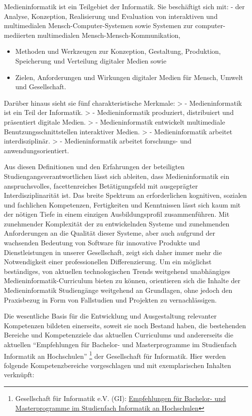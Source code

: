 \begin{siderules}
Medieninformatik ist ein Teilgebiet der Informatik. Sie beschäftigt sich
mit: - der Analyse, Konzeption, Realisierung und Evaluation von
interaktiven und multimedialen Mensch-Computer-Systemen sowie Systemen
zur computer-mediierten multimedialen Mensch-Mensch-Kommunikation,

\begin{itemize}
\tightlist
\item
  Methoden und Werkzeugen zur Konzeption, Gestaltung, Produktion,
  Speicherung und Verteilung digitaler Medien sowie
\item
  Zielen, Anforderungen und Wirkungen digitaler Medien für Mensch,
  Umwelt und Gesellschaft.
\end{itemize}
\end{siderules}

Darüber hinaus sieht sie fünf charakteristische Merkmale: \textgreater{}
- Medieninformatik ist ein Teil der Informatik. \textgreater{} -
Medieninformatik produziert, distribuiert und präsentiert digitale
Medien. \textgreater{} - Medieninformatik entwickelt multimediale
Benutzungsschnittstellen interaktiver Medien. \textgreater{} -
Medieninformatik arbeitet interdisziplinär. \textgreater{} -
Medieninformatik arbeitet forschungs- und anwendungsorientiert.

Aus diesen Definitionen und den Erfahrungen der beteiligten
Studiengangsverantwortlichen lässt sich ableiten, dass Medieninformatik
ein anspruchsvolles, facettenreiches Betätigungsfeld mit ausgeprägter
Interdisziplinarität ist. Das breite Spektrum an erforderlichen
kognitiven, sozialen und fachlichen Kompetenzen, Fertigkeiten und
Kenntnissen lässt sich kaum mit der nötigen Tiefe in einem einzigen
Ausbildungsprofil zusammenführen. Mit zunehmender Komplexität der zu
entwickelnden Systeme und zunehmenden Anforderungen an die Qualität
dieser Systeme, aber auch aufgrund der wachsenden Bedeutung von Software
für innovative Produkte und Dienstleistungen in unserer Gesellschaft,
zeigt sich daher immer mehr die Notwendigkeit einer professionellen
Differenzierung. Um ein möglichst beständiges, von aktuellen
technologischen Trends weitgehend unabhängiges
Medieninformatik-Curriculum bieten zu können, orientieren sich die
Inhalte der Medieninformatik Studiengänge weitgehend an Grundlagen, ohne
jedoch den Praxisbezug in Form von Fallstudien und Projekten zu
vernachlässigen.

Die wesentliche Basis für die Entwicklung und Ausgestaltung relevanter
Kompetenzen bildeten einerseits, soweit sie noch Bestand haben, die
bestehenden Bereiche und Kompetenzziele das aktuellen Curriculums und
andererseits die aktuellen ``Empfehlungen für Bachelor- und
Masterprogramme im Studienfach Informatik an Hochschulen'' \footnote{Gesellschaft
  für Informatik e.V. (GI):
  \href{https://www.gi.de/fileadmin/redaktion/empfehlungen/GI-Empfehlungen_Bachelor-Master-Informatik2016.pdf}{Empfehlungen
  für Bachelor- und Masterprogramme im Studienfach Informatik an
  Hochschulen}} der Gesellschaft für Informatik. Hier werden folgende
Kompetenzbereiche vorgeschlagen und mit exemplarischen Inhalten
verknüpft:


